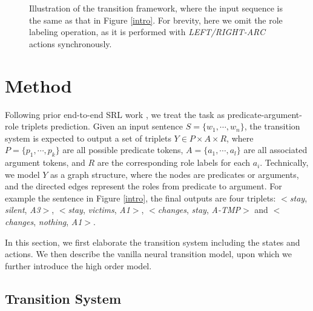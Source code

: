 \documentclass[letterpaper]{article} %
\begin{document}
\begin{CJK}{UTF8}{gbsn}
\begin{figure*}[!t]
\centering
{}
\caption{
Illustration of the transition framework, where the input sequence is the same as that in Figure \ref{intro}.
For brevity, here we omit the role labeling operation, as it is performed with \emph{LEFT/RIGHT-ARC} actions synchronously.
}
\label{sequence}
\end{figure*}













\section{Method}


Following prior end-to-end SRL work \cite{he-etal-2018-jointly,LiHZZZZZ19}, we treat the task as predicate-argument-role triplets prediction.
Given an input sentence $S = \{w_1, \cdots, w_n\}$,
the transition system is expected to output a set of triplets $Y \in P \times A \times R$,
where $P = \{p_1, \cdots, p_k\}$ are all possible predicate tokens, $A = \{a_1, \cdots, a_l\}$ are all associated argument tokens,
and $R$ are the corresponding role labels for each $a_i$.
Technically, we model $Y$ as a graph structure, where the nodes are predicates or arguments, and the directed edges represent the roles from predicate to argument.
For example the sentence in Figure \ref{intro}, the final outputs are four triplets: $<$\emph{stay}, \emph{silent}, \emph{A3}$>$, $<$\emph{stay}, \emph{victims}, \emph{A1}$>$, $<$\emph{changes}, \emph{stay}, \emph{A-TMP}$>$ and $<$\emph{changes}, \emph{nothing}, \emph{A1}$>$.


In this section, we first elaborate the transition system including the states and actions.
We then describe the vanilla neural transition model, upon which we further introduce the high order model.



\subsection{Transition System}



\end{CJK}
\end{document}
